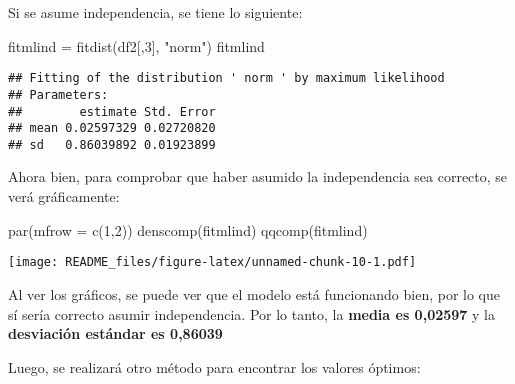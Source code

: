 \documentclass[
]{article}
\newenvironment{Shaded}{\begin{snugshade}}{\end{snugshade}}
\newcommand{\AttributeTok}[1]{\textcolor[rgb]{0.77,0.63,0.00}{#1}}
\newcommand{\DecValTok}[1]{\textcolor[rgb]{0.00,0.00,0.81}{#1}}
\newcommand{\FunctionTok}[1]{\textcolor[rgb]{0.00,0.00,0.00}{#1}}
\newcommand{\NormalTok}[1]{#1}
\newcommand{\OtherTok}[1]{\textcolor[rgb]{0.56,0.35,0.01}{#1}}
\newcommand{\StringTok}[1]{\textcolor[rgb]{0.31,0.60,0.02}{#1}}
\begin{document}
Si se asume independencia, se tiene lo siguiente:

\begin{Shaded}
\begin{Highlighting}[]
\NormalTok{fitmlind }\OtherTok{=} \FunctionTok{fitdist}\NormalTok{(df2[,}\DecValTok{3}\NormalTok{], }\StringTok{"norm"}\NormalTok{)}
\NormalTok{fitmlind}
\end{Highlighting}
\end{Shaded}

\begin{verbatim}
## Fitting of the distribution ' norm ' by maximum likelihood 
## Parameters:
##        estimate Std. Error
## mean 0.02597329 0.02720820
## sd   0.86039892 0.01923899
\end{verbatim}

Ahora bien, para comprobar que haber asumido la independencia sea
correcto, se verá gráficamente:

\begin{Shaded}
\begin{Highlighting}[]
\FunctionTok{par}\NormalTok{(}\AttributeTok{mfrow =} \FunctionTok{c}\NormalTok{(}\DecValTok{1}\NormalTok{,}\DecValTok{2}\NormalTok{))}
\FunctionTok{denscomp}\NormalTok{(fitmlind)}
\FunctionTok{qqcomp}\NormalTok{(fitmlind)}
\end{Highlighting}
\end{Shaded}

\texttt{[image: README\_files/figure-latex/unnamed-chunk-10-1.pdf]}

Al ver los gráficos, se puede ver que el modelo está funcionando bien,
por lo que sí sería correcto asumir independencia. Por lo tanto, la
\textbf{media es 0,02597} y la \textbf{desviación estándar es 0,86039}

Luego, se realizará otro método para encontrar los valores óptimos:
\end{document}
